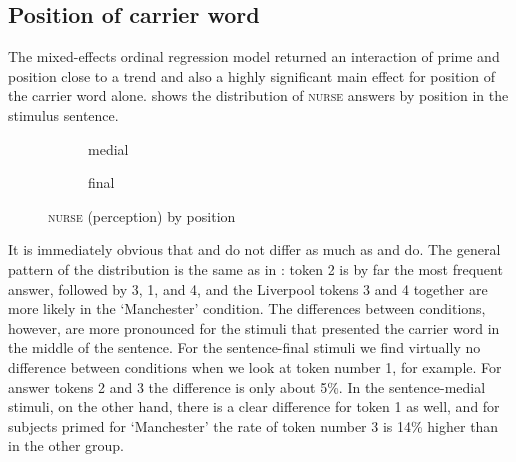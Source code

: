 \subsection{Position of carrier word}
\label{sec.perc_res.nurse.position}

The mixed-effects ordinal regression model returned an interaction of prime and position close to a trend and also a highly significant main effect for position of the carrier word alone.
 shows the distribution of \textsc{nurse} answers by position in the stimulus sentence.

\begin{figure}
	
	\begin{subfigure}{0.49\textwidth}
		
			\resizebox{\linewidth}{!}{} 
		\caption{medial}
		\label{fig.bar.nurse.tot.ext.med}
	\end{subfigure}
	\begin{subfigure}{0.49\textwidth}
		
			\resizebox{\linewidth}{!}{} 
		\caption{final}
		\label{fig.bar.nurse.tot.ext.fin}
	\end{subfigure}
	\caption{\textsc{nurse} (perception) by position}
	\label{fig.bar.nurse.tot.ext.pos}
\end{figure}

It is immediately obvious that  and  do not differ as much as  and  do.
The general pattern of the distribution is the same as in : token 2 is by far the most frequent answer, followed by 3, 1, and 4, and the Liverpool tokens 3 and 4 together are more likely in the `Manchester' condition.
The differences between  conditions, however, are more pronounced for the stimuli that presented the carrier word in the middle of the sentence.
For the sentence-final stimuli we find virtually no difference between  conditions when we look at token number 1, for example.
For answer tokens 2 and 3 the difference is only about 5\%.
In the sentence-medial stimuli, on the other hand, there is a clear difference for token 1 as well, and for subjects primed for `Manchester' the rate of token number 3 is 14\% higher than in the other group.

